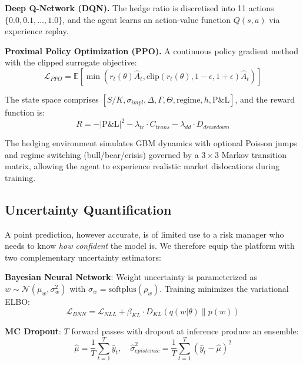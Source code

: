 \documentclass[conference]{IEEEtran}
\begin{document}
\textbf{Deep Q-Network (DQN).} The hedge ratio is discretised into 11 actions $\{0.0, 0.1, \ldots, 1.0\}$, and the agent learns an action-value function $Q(s, a)$ via experience replay.

\textbf{Proximal Policy Optimization (PPO).} A continuous policy gradient method with the clipped surrogate objective:
\begin{equation}
    \mathcal{L}_{PPO} = \mathbb{E}\left[\min\left(r_t(\theta)\hat{A}_t, \text{clip}(r_t(\theta), 1-\epsilon, 1+\epsilon)\hat{A}_t\right)\right]
\end{equation}

The state space comprises $[S/K, \sigma_{impl}, \Delta, \Gamma, \Theta, \text{regime}, h, \text{P\&L}]$, and the reward function is:
\begin{equation}
    R = -|\text{P\&L}|^2 - \lambda_{tc} \cdot C_{trans} - \lambda_{dd} \cdot D_{drawdown}
\end{equation}

The hedging environment simulates GBM dynamics with optional Poisson jumps and regime switching (bull/bear/crisis) governed by a $3 \times 3$ Markov transition matrix, allowing the agent to experience realistic market dislocations during training.

\subsection{Uncertainty Quantification}

A point prediction, however accurate, is of limited use to a risk manager who needs to know \emph{how confident} the model is. We therefore equip the platform with two complementary uncertainty estimators:

\textbf{Bayesian Neural Network}: Weight uncertainty is parameterized as $w \sim \mathcal{N}(\mu_w, \sigma_w^2)$ with $\sigma_w = \text{softplus}(\rho_w)$. Training minimizes the variational ELBO:
\begin{equation}
    \mathcal{L}_{BNN} = \mathcal{L}_{NLL} + \beta_{KL} \cdot D_{KL}(q(w|\theta) \| p(w))
\end{equation}

\textbf{MC Dropout}: $T$ forward passes with dropout at inference produce an ensemble:
\begin{equation}
    \hat{\mu} = \frac{1}{T}\sum_{t=1}^{T}\hat{y}_t, \quad \hat{\sigma}^2_{epistemic} = \frac{1}{T}\sum_{t=1}^{T}(\hat{y}_t - \hat{\mu})^2
\end{equation}
\end{document}
